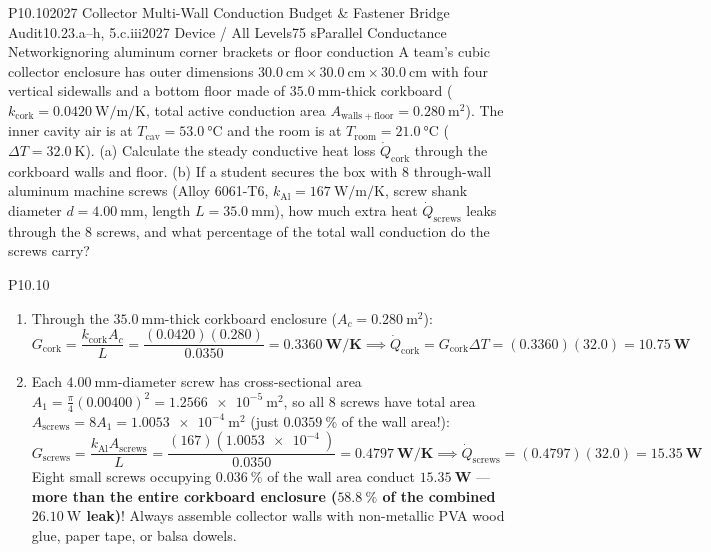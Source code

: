 \begin{problem}{P10.10}{2027 Collector Multi-Wall Conduction Budget \& Fastener Bridge Audit}{10.2}{3.a--h, 5.c.iii}{2027 Device / All Levels}{75 s}{Parallel Conductance Network}{ignoring aluminum corner brackets or floor conduction}
A team's cubic collector enclosure has outer dimensions $\SI{30.0}{\centi\meter}\times\SI{30.0}{\centi\meter}\times\SI{30.0}{\centi\meter}$ with four vertical sidewalls and a bottom floor made of $\SI{35.0}{\milli\meter}$-thick corkboard ($k_{\mathrm{cork}} = \SI{0.0420}{\watt\per\meter\per\kelvin}$, total active conduction area $A_{\mathrm{walls+floor}} = \SI{0.280}{\square\meter}$). The inner cavity air is at $T_{\mathrm{cav}} = \SI{53.0}{\celsius}$ and the room is at $T_{\mathrm{room}} = \SI{21.0}{\celsius}$ ($\Delta T = \SI{32.0}{\kelvin}$). (a) Calculate the steady conductive heat loss $\dot{Q}_{\mathrm{cork}}$ through the corkboard walls and floor. (b) If a student secures the box with $8$ through-wall aluminum machine screws (Alloy 6061-T6, $k_{\mathrm{Al}} = \SI{167}{\watt\per\meter\per\kelvin}$, screw shank diameter $d = \SI{4.00}{\milli\meter}$, length $L = \SI{35.0}{\milli\meter}$), how much extra heat $\dot{Q}_{\mathrm{screws}}$ leaks through the $8$ screws, and what percentage of the total wall conduction do the screws carry?
\end{problem}
\begin{solution}{P10.10}
\begin{enumerate}
  \item[(a)] Through the $\SI{35.0}{\milli\meter}$-thick corkboard enclosure ($A_c = \SI{0.280}{\square\meter}$):
  \[
    G_{\mathrm{cork}} = \frac{k_{\mathrm{cork}} A_c}{L} = \frac{(0.0420)(0.280)}{0.0350} = \mathbf{\SI{0.3360}{\watt\per\kelvin}} \implies
    \dot{Q}_{\mathrm{cork}} = G_{\mathrm{cork}}\Delta T = (0.3360)(32.0) = \mathbf{\SI{10.75}{\watt}}
  \]
  \item[(b)] Each $\SI{4.00}{\milli\meter}$-diameter screw has cross-sectional area $A_1 = \frac{\pi}{4}(0.00400)^2 = \SI{1.2566e-5}{\square\meter}$, so all $8$ screws have total area $A_{\mathrm{screws}} = 8 A_1 = \SI{1.0053e-4}{\square\meter}$ (just $\SI{0.0359}{\percent}$ of the wall area!):
  \[
    G_{\mathrm{screws}} = \frac{k_{\mathrm{Al}} A_{\mathrm{screws}}}{L} = \frac{(167)(\SI{1.0053e-4}{})}{0.0350} = \mathbf{\SI{0.4797}{\watt\per\kelvin}} \implies
    \dot{Q}_{\mathrm{screws}} = (0.4797)(32.0) = \mathbf{\SI{15.35}{\watt}}
  \]
  Eight small screws occupying $\SI{0.036}{\percent}$ of the wall area conduct $\mathbf{\SI{15.35}{\watt}}$ — \textbf{more than the entire corkboard enclosure ($\SI{58.8}{\percent}$ of the combined $\SI{26.10}{\watt}$ leak)}! Always assemble collector walls with non-metallic PVA wood glue, paper tape, or balsa dowels.
\end{enumerate}
\end{solution}


